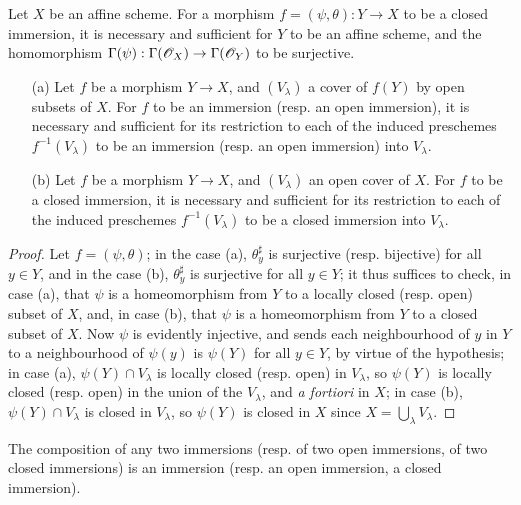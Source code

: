 \begin{corollary}[4.2.3]
\label{I.4.2.3}
Let $X$ be an affine scheme.
For a morphism $f=(\psi,\theta):Y\to X$ to be a closed immersion, it is necessary and sufficient for $Y$ to be an affine scheme, and the homomorphism $\Gamma(\psi):\Gamma(\sh{O}_X)\to\Gamma(\sh{O}_Y)$ to be surjective.
\end{corollary}

\begin{corollary}[4.2.4]
\label{I.4.2.4}
\medskip\noindent
\begin{enumerate}
  \item[{\rm(a)}] Let $f$ be a morphism $Y\to X$, and $(V_\lambda)$ a cover of $f(Y)$ by open subsets of $X$.
    For $f$ to be an immersion (resp. an open immersion), it is necessary and sufficient
    for its restriction to each of the induced preschemes $f^{-1}(V_\lambda)$ to be an immersion (resp. an open immersion) into $V_\lambda$.
  \item[{\rm(b)}] Let $f$ be a morphism $Y\to X$, and $(V_\lambda)$ an open cover of $X$.
    For $f$ to be a closed immersion, it is necessary and sufficient for its restriction to each of the induced preschemes $f^{-1}(V_\lambda)$ to be a closed immersion into $V_\lambda$.
\end{enumerate}
\end{corollary}

\begin{proof}
Let $f=(\psi,\theta)$;
in the case (a), $\theta_y^\sharp$ is surjective (resp. bijective) for all $y\in Y$, and in the case (b), $\theta_y^\sharp$ is surjective for all $y\in Y$;
it thus suffices to check, in case (a), that $\psi$ is a homeomorphism from $Y$ to a locally closed (resp. open) subset of $X$, and, in case (b), that $\psi$ is a homeomorphism from $Y$ to a closed subset of $X$.
Now $\psi$ is evidently injective, and sends each neighbourhood of $y$ in $Y$ to a neighbourhood of $\psi(y)$ is $\psi(Y)$ for all $y\in Y$, by virtue of the hypothesis;
in case (a), $\psi(Y)\cap V_\lambda$ is locally closed (resp. open) in $V_\lambda$, so $\psi(Y)$ is locally closed (resp. open) in the union of the $V_\lambda$, and \emph{a fortiori} in $X$;
in case (b), $\psi(Y)\cap V_\lambda$ is closed in $V_\lambda$, so $\psi(Y)$ is closed in $X$ since $X=\bigcup_\lambda V_\lambda$.
\end{proof}

\begin{proposition}[4.2.5]
\label{I.4.2.5}
The composition of any two immersions (resp. of two open immersions, of two closed immersions) is an immersion (resp. an open immersion, a closed immersion).
\end{proposition}

